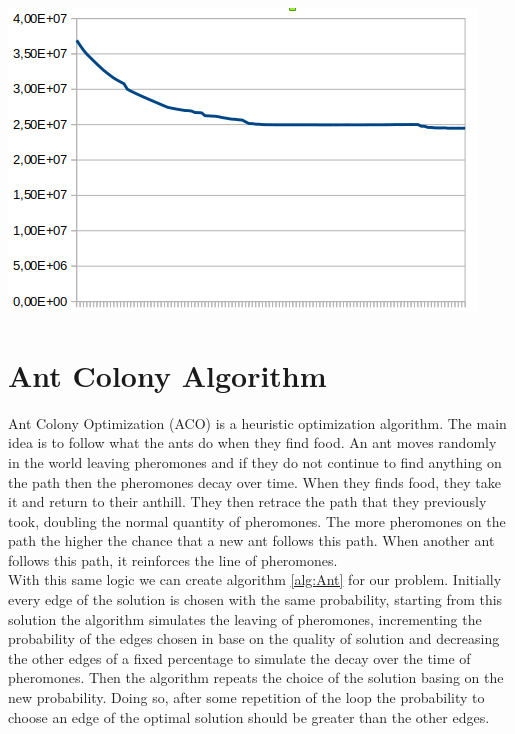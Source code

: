 \begin{center}
	\includegraphics[scale=0.3]{Graphics/graph.png}
	\label{img:wfcp}
\end{center}

\section{Ant Colony Algorithm}
Ant Colony Optimization (ACO) is a heuristic optimization algorithm. The main idea is to follow what the ants do when they find food. An ant moves randomly in the world leaving pheromones and if they do not continue to find anything on the path then the pheromones decay over time. When they finds food, they take it and return to their anthill. They then retrace the path that they previously took, doubling the normal quantity of pheromones. The more pheromones on the path the higher the chance that a new ant follows this path. When another ant follows this path, it reinforces the line of pheromones.\\
With this same logic we can create algorithm \ref{alg:Ant} for our problem. Initially every edge of the solution is chosen with the same probability, starting from this solution the algorithm simulates the leaving of pheromones, incrementing the probability of the edges chosen in base on the quality of solution and decreasing the other edges of a fixed percentage to simulate the decay over the time of pheromones. Then the algorithm repeats the choice of the solution basing on the new probability. Doing so, after some repetition of the loop the probability to choose an edge of the optimal solution should be greater than the other edges.\\

